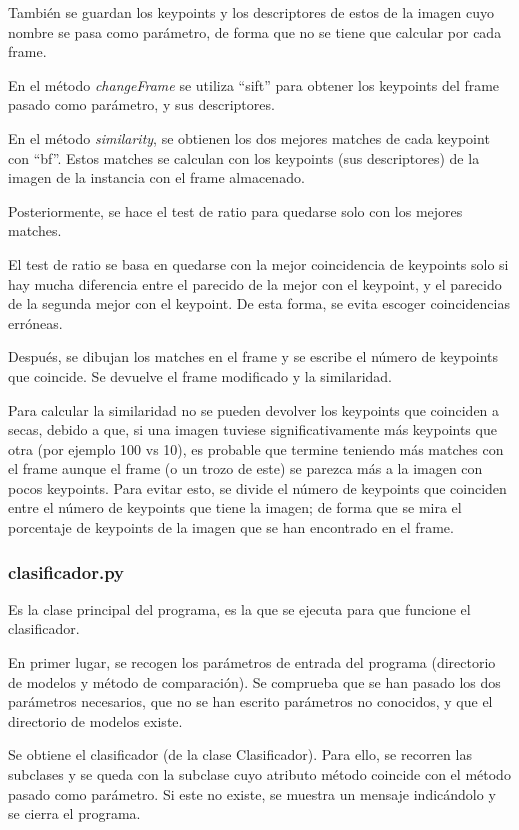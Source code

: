 \documentclass[12pt]{article}
\begin{document}
También se guardan los keypoints y los descriptores de estos de la imagen cuyo nombre se pasa como parámetro, de forma que no se tiene que calcular por cada frame.

En el método \textit{changeFrame} se utiliza ``sift'' para obtener los keypoints del frame pasado como parámetro, y sus descriptores.

En el método \textit{similarity}, se obtienen los dos mejores matches de cada keypoint con ``bf''. Estos matches se calculan con los keypoints (sus descriptores) de la imagen de la instancia con el frame almacenado.

Posteriormente, se hace el test de ratio para quedarse solo con los mejores matches.

El test de ratio se basa en quedarse con la mejor coincidencia de keypoints solo si hay mucha diferencia entre el parecido de la mejor con el keypoint, y el parecido de la segunda mejor con el keypoint. De esta forma, se evita escoger coincidencias erróneas.

Después, se dibujan los matches en el frame y se escribe el número de keypoints que coincide. Se devuelve el frame modificado y la similaridad. 

Para calcular la similaridad no se pueden devolver los keypoints que coinciden a secas, debido a que, si una imagen tuviese significativamente más keypoints que otra (por ejemplo 100 vs 10), es probable que termine teniendo más matches con el frame aunque el frame (o un trozo de este) se parezca más a la imagen con pocos keypoints. Para evitar esto, se divide el número de keypoints que coinciden entre el número de keypoints que tiene la imagen; de forma que se mira el porcentaje de keypoints de la imagen que se han encontrado en el frame.

\subsubsection*{clasificador.py}
Es la clase principal del programa, es la que se ejecuta para que funcione el clasificador.

En primer lugar, se recogen los parámetros de entrada del programa (directorio de modelos y método de comparación). Se comprueba que se han pasado los dos parámetros necesarios, que no se han escrito parámetros no conocidos, y que el directorio de modelos existe.

Se obtiene el clasificador (de la clase Clasificador). Para ello, se recorren las subclases y se queda con la subclase cuyo atributo método coincide con el método pasado como parámetro. Si este no existe, se muestra un mensaje indicándolo y se cierra el programa.
\end{document}
